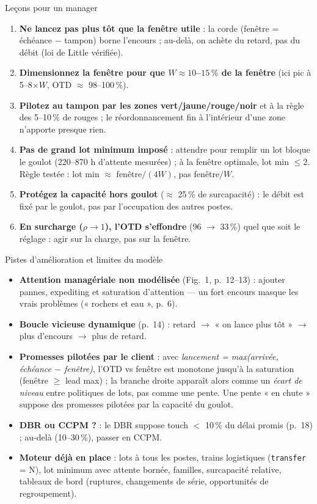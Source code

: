\documentclass[10pt,aspectratio=169]{beamer}
\begin{document}
\begin{frame}{Leçons pour un manager}
\begin{enumerate}
  \item \textbf{Ne lancez pas plus tôt que la fenêtre utile} : la corde (fenêtre = échéance $-$ tampon)
        borne l'encours ; au-delà, on achète du retard, pas du débit (loi de Little vérifiée).
  \item \textbf{Dimensionnez la fenêtre pour que $W \approx 10$--$15\,\%$ de la fenêtre}
        (ici pic à 5--8$\times W$, OTD $\approx$ 98--100\,\%).
  \item \textbf{Pilotez au tampon par les zones vert/jaune/rouge/noir} et à la règle des 5--10\,\% de rouges ;
        le réordonnancement fin à l'intérieur d'une zone n'apporte presque rien.
  \item \textbf{Pas de grand lot minimum imposé} : attendre pour remplir un lot bloque le goulot
        (220--870 h d'attente mesurées) ; à la fenêtre optimale, lot min $\leq 2$.
        Règle testée : lot min $\approx$ fenêtre$/(4W)$, pas fenêtre$/W$.
  \item \textbf{Protégez la capacité hors goulot} ($\approx$ 25\,\% de surcapacité) :
        le débit est fixé par le goulot, pas par l'occupation des autres postes.
  \item \textbf{En surcharge ($\rho \to 1$), l'OTD s'effondre} (96 $\rightarrow$ 33\,\%) quel que soit le réglage :
        agir sur la charge, pas sur la fenêtre.
\end{enumerate}
\end{frame}

\begin{frame}{Pistes d'amélioration et limites du modèle}
\small
\begin{itemize}
  \item \textbf{Attention managériale non modélisée} (Fig.~1, p.~12--13) : ajouter pannes, expediting et
        saturation d'attention --- un fort encours masque les vrais problèmes (« rochers et eau », p.~6).
  \item \textbf{Boucle vicieuse dynamique} (p.~14) : retard $\rightarrow$ « on lance plus tôt »
        $\rightarrow$ plus d'encours $\rightarrow$ plus de retard.
  \item \textbf{Promesses pilotées par le client} : avec \emph{lancement = max(arrivée, échéance $-$ fenêtre)},
        l'OTD vs fenêtre est monotone jusqu'à la saturation (fenêtre $\geq$ lead max) ; la branche droite
        apparaît alors comme un \emph{écart de niveau} entre politiques de lots, pas comme une pente.
        Une pente « en chute » suppose des promesses pilotées par la capacité du goulot.
  \item \textbf{DBR ou CCPM ?} : le DBR suppose touch $<$ 10\,\% du délai promis (p.~18) ;
        au-delà (10--30\,\%), passer en CCPM.
  \item \textbf{Moteur déjà en place} : lots à tous les postes, trains logistiques (\texttt{transfer} = N),
        lot minimum avec attente bornée, familles, surcapacité relative, tableaux de bord
        (ruptures, changements de série, opportunités de regroupement).
\end{itemize}
\end{frame}
\end{document}
